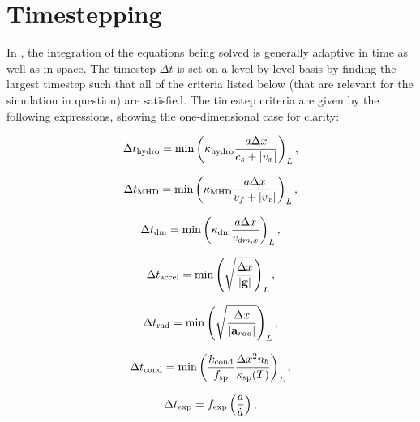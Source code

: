 \section{Timestepping}
\label{sec.timestepping}

In \enzo, the integration of the equations being solved is generally adaptive in time 
as well as in space.  The timestep $\Delta t$ is set on a level-by-level
basis by finding the largest timestep such that all of the criteria
listed below (that are relevant for the simulation in question) are
satisfied.  The timestep criteria are given by the following
expressions, showing the one-dimensional case for clarity:

\begin{equation}
\Delta t_{\rm hydro} = \min \left( \kappa_{\rm hydro} \frac{a \Delta x}{c_{s} + |v_x|} \right)_L ,
\label{eqn:dthydro}
\end{equation}

\begin{equation}
\Delta t_{\rm MHD} = \min \left( \kappa_{\rm MHD} \frac{a \Delta x}{v_{f} + |v_x|} \right)_L ,
\label{eqn:dtMHD}
\end{equation}

\begin{equation}
\Delta t_{\rm dm} = \min \left(\kappa_{\rm dm} \frac{a \Delta x}{v_{dm,x}} \right)_L ,
\label{eqn:dtdarkmatter}
\end{equation}

\begin{equation}
\Delta t_{\rm accel} = \min \left( \sqrt{\frac{\Delta x}{|\myvec{g}|}} \right)_L ,
\label{eqn:dtaccel}
\end{equation}

\begin{equation}
\Delta t_{\rm rad} = \min \left(  \sqrt{\frac{\Delta x}{|\myvec{a}_{rad}|}} \right)_L,
\label{eqn:dtrad}
\end{equation}

\begin{equation}
\Delta t_{\rm cond} = \min \left(  \frac{ k_{\rm cond}}{f_{\rm sp}} \frac{\Delta x^2
    n_b}{\kappa_{\rm sp}(T)} \right)_L,
\label{eqn:dtcond}
\end{equation}

\begin{equation}
\Delta t_{\rm exp} = f_{\rm exp} \left( \frac{a}{\dot{a}} \right) ,
\label{eqn:dtexpand}
\end{equation}


